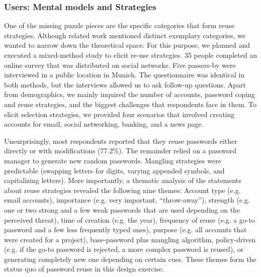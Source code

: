 \subsubsection{Users: Mental models and Strategies}
One of the missing puzzle pieces are the specific categories that form reuse strategies. Although related work mentioned distinct exemplary categories, we wanted to narrow down the theoretical space. For this purpose, we planned and executed a mixed-method study to elicit re-use strategies. 35 people completed an online survey that was distributed on social networks. Five passers-by were interviewed in a public location in Munich. The questionnaire was identical in both methods, but the interviews allowed us to ask follow-up questions. Apart from demographics, we mainly inquired the number of accounts, password coping and reuse strategies, and the biggest challenges that respondents face in them. To elicit selection strategies, we provided four scenarios that involved creating accounts for email, social networking, banking, and a news page.

Unsurprisingly, most respondents reported that they reuse passwords either directly or with modifications (77.2\%). The remainder relied on a password manager to generate new random passwords. Mangling strategies were predictable (swapping letters for digits, varying appended symbols, and capitalizing letters). More importantly, a thematic analysis of the statements about reuse strategies revealed the following nine themes: Account type (e.g. email accounts), importance (e.g. very important, ``throw-away''), strength (e.g. one or two strong and a few weak passwords that are used depending on the perceived threat), time of creation (e.g. the year), frequency of reuse (e.g. a go-to password and a few less frequently typed ones), purpose (e.g. all accounts that were created for a project), base-password plus mangling algorithm, policy-driven (e.g. if the go-to password is rejected, a more complex password is reused), or generating completely new one depending on certain cues. These themes form the status quo of password reuse in this design exercise.  

